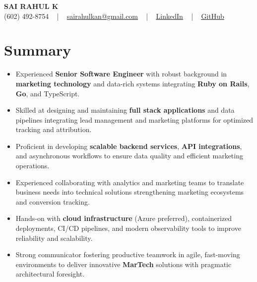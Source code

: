 \documentclass[letterpaper,11pt]{article}
\newcommand{\resumeItem}[1]{
  \item\footnotesize{
    {#1 \vspace{-2pt}}
  }
}
\newcommand{\resumeItemListStart}{\begin{itemize}[leftmargin=*]}
\newcommand{\resumeItemListEnd}{\end{itemize}\vspace{-5pt}}
\begin{document}
\begin{center}
    {\fontsize{14pt}{12pt}\selectfont \textbf{\MakeUppercase{Sai Rahul K}}}\\ \vspace{2pt}
    \fontsize{10pt}{12pt}\selectfont (602) 492-8754 ~ | ~ \href{mailto:sairahulkan@gmail.com}{sairahulkan@gmail.com} ~ | ~
    \href{https://www.linkedin.com/in/rq123/}{\color{blue}\underline{LinkedIn}} ~ | ~
    \href{https://github.com/kanrahuldo}{\color{blue}\underline{GitHub}}~
    \vspace{-8pt}
\end{center}

\section{Summary}
\fontsize{9pt}{10pt}\selectfont
\resumeItemListStart
    \resumeItem{Experienced \textbf{Senior Software Engineer} with robust background in \textbf{marketing technology} and data-rich systems integrating \textbf{Ruby on Rails}, \textbf{Go}, and TypeScript.}
    \resumeItem{Skilled at designing and maintaining \textbf{full stack applications} and data pipelines integrating lead management and marketing platforms for optimized tracking and attribution.}
    \resumeItem{Proficient in developing \textbf{scalable backend services}, \textbf{API integrations}, and asynchronous workflows to ensure data quality and efficient marketing operations.}
    \resumeItem{Experienced collaborating with analytics and marketing teams to translate business needs into technical solutions strengthening marketing ecosystems and conversion tracking.}
    \resumeItem{Hands-on with \textbf{cloud infrastructure} (Azure preferred), containerized deployments, CI/CD pipelines, and modern observability tools to improve reliability and scalability.}
    \resumeItem{Strong communicator fostering productive teamwork in agile, fast-moving environments to deliver innovative \textbf{MarTech} solutions with pragmatic architectural foresight.}
\resumeItemListEnd
\vspace{-6pt}
\end{document}

